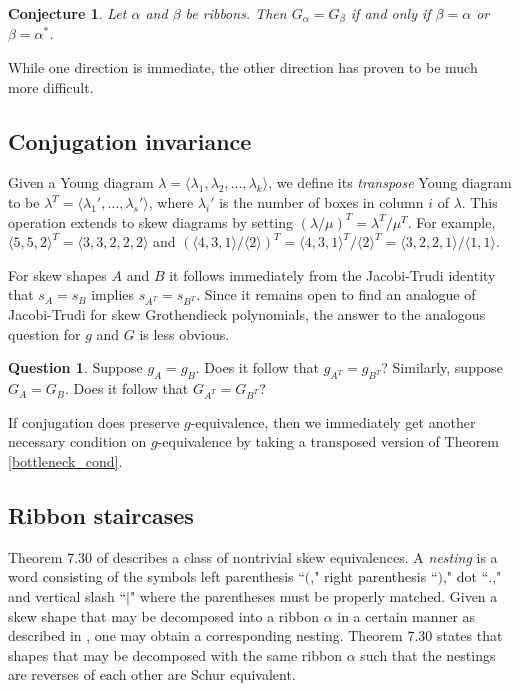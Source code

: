 \documentclass[12pt]{amsart}
\newtheorem{conj}[thm]{Conjecture}
\theoremstyle{definition}
\newtheorem{question}[thm]{Question}
\begin{document}
\begin{conj}
Let $\alpha$ and $\beta$ be ribbons. Then $G_\alpha = G_\beta$ if and only if $\beta=\alpha$ or $\beta=\alpha^*$. 
\end{conj}
While one direction is immediate, the other direction has proven to be much more difficult. 


\subsection{Conjugation invariance}
Given a Young diagram $\lambda=\langle\lambda_1,\lambda_2,\ldots,\lambda_k\rangle$, we define its \textit{transpose} Young diagram to be $\lambda^T=\langle \lambda_1',\dots,\lambda_s'\rangle$, where $\lambda_i'$ is the number of boxes in column $i$ of $\lambda$. This operation extends to skew diagrams by setting $(\lambda/\mu ) ^T = \lambda^T/\mu^T$. For example, $\langle 5,5,2\rangle^T=\langle 3,3,2,2,2\rangle$ and $(\langle 4,3,1\rangle/\langle 2\rangle)^T=\langle 4,3,1\rangle^T/\langle 2\rangle^T=\langle 3,2,2,1\rangle/\langle 1,1\rangle$.

For skew shapes $A$ and $B$ it follows immediately from the Jacobi-Trudi identity that $s_A = s_B$ implies $s_{A^T} = s_{B^T}$. Since it remains open to find an analogue of Jacobi-Trudi for skew Grothendieck polynomials, the answer to the analogous question for $g$ and $G$ is less obvious.

\begin{question}
Suppose $g_A = g_B$. Does it follow that $g_{A^T} = g_{B^T}$? Similarly, suppose $G_A = G_B$. Does it follow that $G_{A^T} = G_{B^T}$?
\end{question}

If conjugation does preserve $g$-equivalence, then we immediately get another necessary condition on $g$-equivalence by taking a transposed version of Theorem \ref{bottleneck_cond}.

\subsection{Ribbon staircases}
Theorem 7.30 of \cite{rsw2009coincidences} describes a class of nontrivial skew equivalences. A \textit{nesting} is a word consisting of the symbols  left parenthesis ``$($," right parenthesis ``$)$," dot ``$.$," and vertical slash ``$|$" where the parentheses must be properly matched. Given a skew shape that may be decomposed into a ribbon $\alpha$ in a certain manner as described in \cite{rsw2009coincidences}, one may obtain a corresponding nesting. Theorem 7.30 states that shapes that may be decomposed with the same ribbon $\alpha$ such that the nestings are reverses of each other are Schur equivalent.
\end{document}

